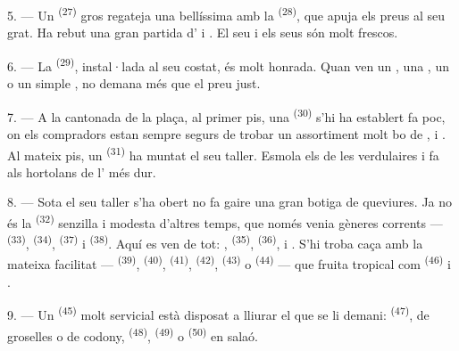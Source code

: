 5. --- Un  \textsuperscript{(27)} gros regateja una  bellíssima
amb la  \textsuperscript{(28)}, que apuja els preus al seu grat. Ha rebut
una gran partida d' i . El seu
 i els seus
 són molt frescos.

\VUsaut{4.0mm}
\VUsaut{3.0mm}

6. --- La  \textsuperscript{(29)}, instal·lada al seu costat, és molt
honrada. Quan ven un , una , un  o un simple
, no demana més que el preu just.

7. --- A la cantonada de la plaça, al primer pis, una 
\textsuperscript{(30)} s'hi ha establert fa poc, on els compradors estan sempre segurs de
trobar un assortiment molt bo de ,
 i . Al mateix pis, un
 \textsuperscript{(31)} ha muntat el seu taller. Esmola els
 de les verdulaires i fa als hortolans  de
l' més dur.

\VUsaut{4.0mm}
\VUsaut{3.0mm}

8. --- Sota el seu taller s'ha obert no fa gaire una gran botiga de queviures. Ja no és la
 \textsuperscript{(32)} senzilla i modesta d'altres temps, que
només venia gèneres corrents ---  \textsuperscript{(33)}, 
\textsuperscript{(34)},  \textsuperscript{(37)} i 
\textsuperscript{(38)}. Aquí es ven de tot: , 
\textsuperscript{(35)},
 \textsuperscript{(36)},  i
. S'hi troba caça amb la mateixa facilitat --- 
\textsuperscript{(39)},  \textsuperscript{(40)}, 
\textsuperscript{(41)},  \textsuperscript{(42)}, 
\textsuperscript{(43)} o  \textsuperscript{(44)} --- que fruita tropical com
 \textsuperscript{(46)} i .

9. --- Un  \textsuperscript{(45)} molt servicial està disposat a lliurar el
que se li demani:  \textsuperscript{(47)}, de groselles o de codony,
 \textsuperscript{(48)},  \textsuperscript{(49)} o
 \textsuperscript{(50)} en salaó.

